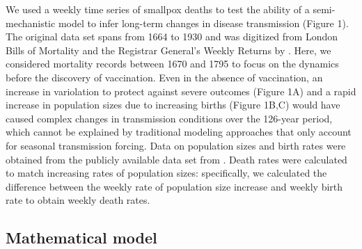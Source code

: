 \documentclass[12pt]{article}
\begin{document}
We used a weekly time series of smallpox deaths to test the ability of a semi-mechanistic model to infer long-term changes in disease transmission (Figure 1).
The original data set spans from 1664 to 1930 and was digitized from London Bills of Mortality and the Registrar General’s Weekly Returns by \cite{krylova2020patterns}.
Here, we considered mortality records between 1670 and 1795 to focus on the dynamics before the discovery of vaccination.
Even in the absence of vaccination, an increase in variolation to protect against severe outcomes (Figure 1A) and a rapid increase in population sizes due to increasing births (Figure 1B,C) would have caused complex changes in transmission conditions over the 126-year period, which cannot be explained by traditional modeling approaches that only account for seasonal transmission forcing. 
Data on population sizes and birth rates were obtained from the publicly available data set from \citep{krylova2020patterns}.
Death rates were calculated to match increasing rates of population sizes:
specifically, we calculated the difference between the weekly rate of population size increase and weekly  birth rate to obtain weekly death rates.

\subsection*{Mathematical model}
\end{document}
